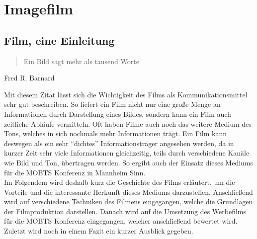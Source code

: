 \chapter{Imagefilm}
\section{Film, eine Einleitung}
\begin{quote}
    Ein Bild sagt mehr als tausend Worte
\end{quote}
\begin{flushright}
    Fred R. Barnard
\end{flushright}
Mit diesem Zitat lässt sich die Wichtigkeit des Films als Kommunikationsmittel sehr gut beschreiben. So liefert ein Film nicht nur eine große Menge an Informationen durch Darstellung eines Bildes, sondern kann ein Film auch zeitliche Abläufe vermitteln. Oft haben Filme auch noch das weitere Medium des Tons, welches in sich nochmals mehr Informationen trägt. Ein Film kann deswegen als ein sehr \enquote{dichtes} Informationsträger angesehen werden, da in kurzer Zeit sehr viele Informationen gleichzeitig, teils durch verschiedene Kanäle wie Bild und Ton, übertragen werden. So ergibt auch der Einsatz dieses Mediums für die \ac{MOBTS} Konferenz in Mannheim Sinn.\\

Im Folgendem wird deshalb kurz die Geschichte des Films erläutert, um die Vorteile und die interessante Herkunft dieses Mediums darzustellen. Anschließend wird auf verschiedene Techniken des Filmens eingegangen, welche die Grundlagen der Filmproduktion darstellen. Danach wird auf die Umsetzung des Werbefilms für die \ac{MOBTS} Konferenz eingegangen, welcher anschließend bewertet wird. Zuletzt wird noch in einem Fazit ein kurzer Ausblick gegeben.
